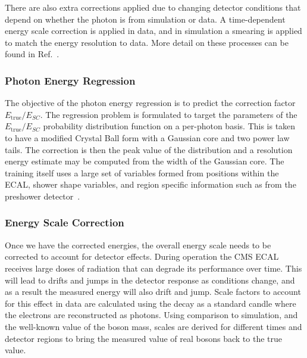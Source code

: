 There are also extra corrections applied due to changing detector conditions that depend on whether the photon is from simulation or data. A time-dependent energy scale correction is applied in data, and in simulation a smearing is applied to match the energy resolution to data. 
More detail on these processes can be found in Ref.~\cite{PhotonReco}.

\subsubsection{Photon Energy Regression}
The objective of the photon energy regression is to predict the correction factor $E_{\mathrm{true}}/E_{SC}$. 
The regression problem is formulated to target the parameters of the $E_{\mathrm{true}}/E_{SC}$ probability distribution function on a per-photon basis. 
This is taken to have a modified Crystal Ball form with a Gaussian core and two power law tails. 
The correction is then the peak value of the distribution and a resolution energy estimate may be computed from the width of the Gaussian core. 
The training itself uses a large set of variables formed from positions within the ECAL, shower shape variables, and region specific information such as from the preshower detector~\cite{CMSHiggsPhotonReco}.


\subsubsection{Energy Scale Correction}
Once we have the corrected energies, the overall energy scale needs to be corrected to account for detector effects. 
During operation the CMS ECAL receives large doses of radiation that can degrade its performance over time. 
This will lead to drifts and jumps in the detector response as conditions change, and as a result the measured energy will also drift and jump. 
Scale factors to account for this effect in data are calculated using the \Zee decay as a standard candle where the electrons are reconstructed as photons. 
Using comparison to simulation, and the well-known value of the \Z boson mass, scales are derived for different times and detector regions to bring the measured value of real \Z bosons back to the true value. 

